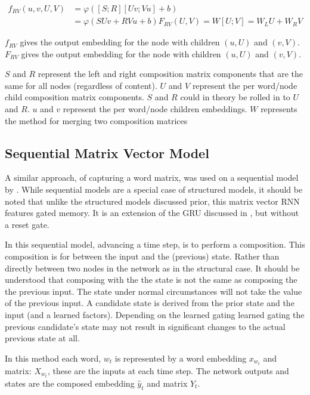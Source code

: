 \documentclass[12pt,parskip]{komatufte}
\begin{document}
\begin{align}
f_{RV}(u, v, U, V) &= \varphi\left( [S;R][Uv;Vu] + b \right) \\ 
&= \varphi\left( SUv +RVu + b \right)
F_{RV}(U, V) = W[U;V] = W_L U + W_R V
\end{align}

$f_{RV}$ gives the output embedding for the node with children $(u,U)$ and $(v,V)$.
$F_{RV}$ gives the output embedding for the node with children $(u,U)$ and $(v,V)$.

$S$ and $R$ represent the left and right composition matrix components that are the same for all nodes (regardless of content).
$U$ and $V$ represent the per word/node child composition matrix components.
$S$ and $R$ could in theory be rolled in to $U$ and $R$.
$u$ and $v$ represent the per word/node children embeddings.
$W$ represents the method for merging two composition matrices






\subsection{Sequential Matrix Vector Model}
A similar approach, of capturing a word matrix, 
was used on a sequential model by .
While sequential models are a special case of structured models,
it should be noted that unlike the structured models discussed prior,
this matrix vector RNN features gated memory.
It is an extension of the GRU discussed in , but without a reset gate.


In this sequential model, advancing a time step, is to perform a composition.
This composition is for between the input and the (previous) state.
Rather than directly between two nodes in the network as in the structural case.
It should be understood that composing with the the state is not the same as composing the the previous input.
The state under normal circumstances will not take the value of the previous input.
A candidate state is derived from the prior state and the input (and a learned factors).
Depending on the learned gating learned gating the previous candidate's state may not result in significant changes to the actual previous state at all.


In this method each word, $w_t$ is represented by a word embedding $x_{w_t}$ and matrix: $X_{w_t}$, these are the inputs at each time step.
The network outputs and states are the composed embedding $\hat{y}_t$ and matrix $Y_t$.
\end{document}
